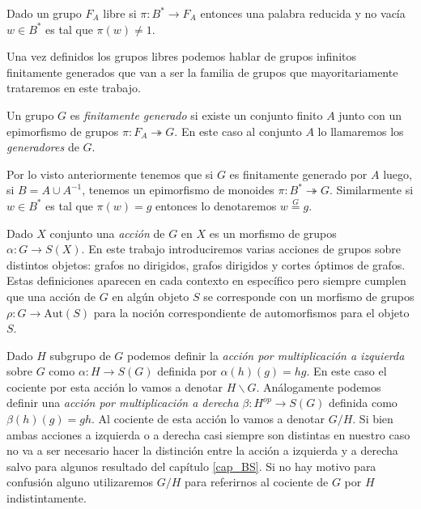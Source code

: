 \documentclass[tesis.tex]{subfiles}
\begin{document}
\begin{obs}\label{obs_libres_pal_red}
	Dado un grupo $F_{A}$ libre si $\pi:B^* \to F_{A}$ entonces una palabra reducida y no vacía $w \in B^*$  es tal que $\pi(w) \neq 1$.
\end{obs}

Una vez definidos los grupos libres podemos hablar de grupos infinitos finitamente generados que van a ser la familia de grupos que mayoritariamente trataremos en este trabajo.


\begin{deff}
	Un grupo $G$ es \emph{finitamente generado} si existe un conjunto finito $A$ junto con un epimorfismo de grupos $\pi: F_{A} \twoheadrightarrow G$.
	En este caso al conjunto $A$ lo llamaremos los \emph{generadores} de $G$.
\end{deff}

Por lo visto anteriormente tenemos que si $G$ es finitamente generado por $A$ luego, si $B = A \cup A^{-1}$, 
tenemos un epimorfismo de monoides $\pi:B^* \twoheadrightarrow G$.
Similarmente si $w \in B^*$ es tal que $\pi(w) = g$ entonces lo denotaremos $w \overset{G}{=} g$.

\medskip



Dado $X$ conjunto una \emph{acción} de $G$ en $X$ es un morfismo de grupos $\alpha: G \to S(X)$.
En este trabajo introduciremos varias acciones de grupos sobre distintos objetos: grafos no dirigidos, grafos dirigidos y cortes óptimos de grafos. 
Estas definiciones aparecen en cada contexto en específico pero siempre cumplen que una acción de $G$ en algún objeto $S$ se corresponde con un morfismo de grupos $\rho:G \to \text{Aut}(S)$ para la noción correspondiente de automorfismos para el objeto $S$.

	
Dado $H$ subgrupo de $G$ podemos definir la \emph{acción por multiplicación a izquierda} sobre $G$ como $\alpha: H \to S(G)$ definida por $\alpha(h)(g) = hg$.
En este caso el cociente por esta acción lo vamos a denotar $H \backslash G $.
Análogamente podemos definir una \emph{acción por multiplicación a derecha} $\beta:H^{op} \to S(G)$ definida como $\beta(h)(g) = gh$.
Al cociente de esta acción lo vamos a denotar $G/H$.
Si bien ambas acciones a izquierda o a derecha casi siempre son distintas en nuestro caso no va a ser necesario hacer la distinción entre la acción a izquierda y a derecha salvo para algunos resultado del capítulo \ref{cap_BS}.
Si no hay motivo para confusión alguno utilizaremos $G/H$ para referirnos al cociente de $G$ por $H$ indistintamente.
\end{document}
